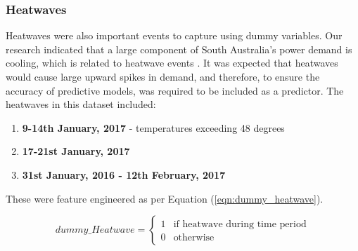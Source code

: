 \documentclass[11pt]{article}
\begin{document}
\subsubsection{Heatwaves}
\label{section:heatwaves}
Heatwaves were also important events to capture using dummy variables. Our research indicated that a large component of South Australia's power demand is cooling, which is related to heatwave events \citep{griffiths_heatwave_2018}. It was expected that heatwaves would cause large upward spikes in demand, and therefore, to ensure the accuracy of predictive models, was required to be included as a predictor. The heatwaves in this dataset included:

\begin{enumerate}
\item \textbf{9-14th January, 2017} - temperatures exceeding 48 degrees
\item \textbf{17-21st January, 2017}
\item \textbf{31st January, 2016 -   12th February, 2017}
\end{enumerate}

\noindent These were feature engineered as per Equation (\ref{eqn:dummy_heatwave}).

\begin{equation}
\label{eqn:dummy_heatwave}
dummy\_Heatwave = 
  \begin{cases}
	1 & \text{if heatwave during time period} \\
    0 & \text{otherwise}
  \end{cases}
\end{equation}


\end{document}
